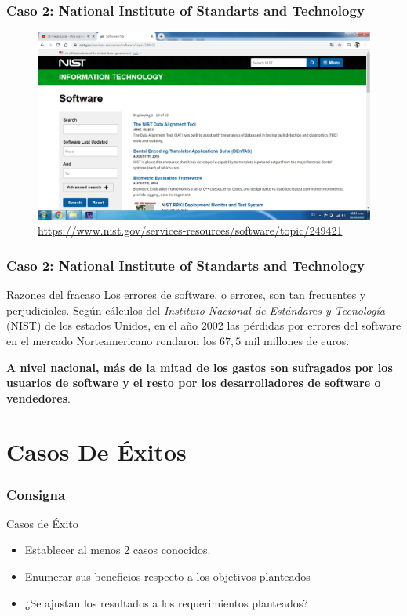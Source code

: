 \documentclass[11pt]{beamer}
\begin{document}
	\begin{frame}
		\frametitle{Caso 2: National Institute of Standarts and Technology}
		\begin{figure}
			\centering
			\includegraphics[width=\textheight]{NIST.PNG}
			\caption{{\scriptsize \url{https://www.nist.gov/services-resources/software/topic/249421}}}
		\end{figure}
	\end{frame}
    
    \begin{frame}
    	\frametitle{Caso 2: National Institute of Standarts and Technology}
    	\begin{block}{Razones del fracaso}
    		 Los errores de software, o errores, son tan frecuentes y perjudiciales. Según cálculos del \textit{Instituto Nacional de Estándares y Tecnología} (NIST) de los  estados Unidos, en el año $2002$ las pérdidas por errores del software en el mercado Norteamericano rondaron los $67,5$ mil millones de euros.
    		
    		\textbf{A nivel nacional, más de la mitad de los gastos son sufragados por los usuarios de software y el resto por los desarrolladores de software o vendedores}.
    	\end{block}
    \end{frame}

    \section{Casos De Éxitos}
    
    \begin{frame}
    	\frametitle{Consigna}
    	\begin{exampleblock}{Casos de Éxito}
    		\begin{itemize}
    			\item Establecer al menos 2 casos conocidos.
    			\item Enumerar sus beneficios respecto a los objetivos planteados
    			\item ¿Se ajustan los resultados a los requerimientos planteados?
    		\end{itemize}
    	\end{exampleblock}
    \end{frame}
    
\end{document}
